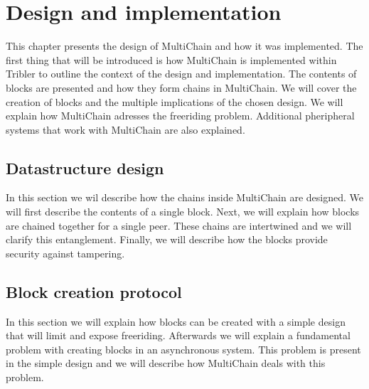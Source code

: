 \chapter{Design and implementation}
This chapter presents the design of MultiChain and how it was implemented.
The first thing that will be introduced is how MultiChain is implemented within Tribler
to outline the context of the design and implementation.
The contents of blocks are presented and how they form chains in MultiChain.
We will cover the creation of blocks and the multiple implications of the chosen design.
We will explain how MultiChain adresses the freeriding problem.
Additional pheripheral systems that work with MultiChain are also explained.



\section{Datastructure design}
In this section we wil describe how the chains inside MultiChain are designed.
We will first describe the contents of a single block.
Next, we will explain how blocks are chained together for a single peer.
These chains are intertwined and we will clarify this entanglement.
Finally, we will describe how the blocks provide security against tampering.






\section{Block creation protocol}
\label{design:block_creation}
In this section we will explain how blocks can be created with a simple design
that will limit and expose freeriding.
Afterwards we will explain a fundamental problem with creating blocks in an asynchronous system.
This problem is present in the simple design
and we will describe how MultiChain deals with this problem.














